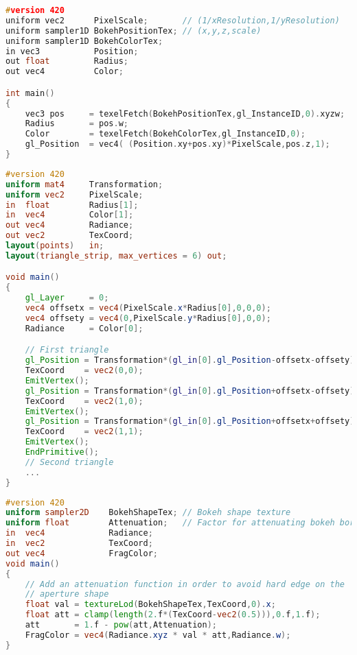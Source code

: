 \begin{lstlisting}[language=C++,float={htb},caption={Pixel shader application for rendering bokeh \emph{(Pass 4)}.},label={DeRousiers:renderingbokehps}]
#version 420
uniform vec2      PixelScale;       // (1/xResolution,1/yResolution)
uniform sampler1D BokehPositionTex; // (x,y,z,scale)
uniform sampler1D BokehColorTex;
in vec3           Position;
out float         Radius;
out vec4          Color;

int main()
{
	vec3 pos     = texelFetch(BokehPositionTex,gl_InstanceID,0).xyzw;
	Radius       = pos.w;
	Color        = texelFetch(BokehColorTex,gl_InstanceID,0);
	gl_Position	 = vec4( (Position.xy+pos.xy)*PixelScale,pos.z,1);
}
\end{lstlisting}

\begin{lstlisting}[language=GLSL,float={htb},caption={Geometry shader for rendering bokeh \emph{(Pass 4)}.},label={DeRousiers:renderingbokehgs}]
#version 420
uniform mat4     Transformation;
uniform vec2     PixelScale;
in  float        Radius[1];
in  vec4         Color[1];
out vec4         Radiance;
out vec2         TexCoord;
layout(points)   in;
layout(triangle_strip, max_vertices = 6) out;

void main()
{
	gl_Layer     = 0;
	vec4 offsetx = vec4(PixelScale.x*Radius[0],0,0,0);
	vec4 offsety = vec4(0,PixelScale.y*Radius[0],0,0);
	Radiance     = Color[0];

	// First triangle
	gl_Position = Transformation*(gl_in[0].gl_Position-offsetx-offsety);
	TexCoord    = vec2(0,0);
	EmitVertex();
	gl_Position = Transformation*(gl_in[0].gl_Position+offsetx-offsety);
	TexCoord    = vec2(1,0);
	EmitVertex();
	gl_Position = Transformation*(gl_in[0].gl_Position+offsetx+offsety);
	TexCoord    = vec2(1,1);
	EmitVertex();
	EndPrimitive();
	// Second triangle
	...
}
\end{lstlisting}


\begin{lstlisting}[language=GLSL,float={htb},caption={Fragment shader for rendering bokeh \emph{(Pass 4)}.},label={DeRousiers:renderingbokehfs}]
#version 420
uniform sampler2D    BokehShapeTex; // Bokeh shape texture
uniform float        Attenuation;   // Factor for attenuating bokeh borders
in  vec4             Radiance;
in  vec2             TexCoord;
out vec4             FragColor;
void main()
{
	// Add an attenuation function in order to avoid hard edge on the 
	// aperture shape
	float val = textureLod(BokehShapeTex,TexCoord,0).x;
	float att = clamp(length(2.f*(TexCoord-vec2(0.5))),0.f,1.f);
	att       = 1.f - pow(att,Attenuation);
	FragColor = vec4(Radiance.xyz * val * att,Radiance.w);
}
\end{lstlisting}
















